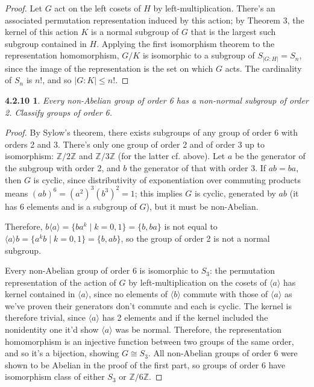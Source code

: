 \documentclass{article}
\newtheorem*{4.2.10}{4.2.10}
\begin{document}
\begin{proof}
  Let $G$ act on the left cosets of $H$ by left-multiplication.
  There's an associated permutation representation induced by this action; by Theorem 3, the kernel of this action $K$ is a normal subgroup of $G$
  that is the largest such subgroup contained in $H$.
  Applying the first isomorphism theorem to the representation homomorphism, $G / K$ is isomorphic to a subgroup of $S_{|G : H|} = S_{n}$,
  since the image of the representation is the set on which $G$ acts.
  The cardinality of $S_{n}$ is $n!$, and so $|G : K| \leq n!$.
\end{proof}

\begin{4.2.10}
  Every non-Abelian group of order 6 has a non-normal subgroup of order 2. Classify groups of order 6.
\end{4.2.10}

\begin{proof}
  By Sylow's theorem, there exists subgroups of any group of order 6 with orders 2 and 3.
  There's only one group of order 2 and of order 3 up to isomorphism: $\mathbb{Z} / 2\mathbb{Z}$ and $\mathbb{Z} / 3\mathbb{Z}$ (for the latter cf. above).
  Let $a$ be the generator of the subgroup with order 2, and $b$ the generator of that with order 3.
  If $ab = ba$, then $G$ is cyclic, since distributivity of exponentiation over commuting products means $(ab)^{6} = (a^{2})^{3}(b^{3})^{2} = 1$;
  this implies $G$ is cyclic, generated by $ab$ (it has 6 elements and is a subgroup of $G$), but it must be non-Abelian.

  Therefore, $b\langle a \rangle = \{ba^{k} \mid k = 0, 1\} = \{b, ba\}$ is not equal to $\langle a \rangle b = \{a^{k}b \mid k = 0, 1\} = \{b, ab\}$,
  so the group of order 2 is not a normal subgroup.

  Every non-Abelian group of order 6 is isomorphic to $S_{3}$: the permutation representation of the action of $G$ by left-multiplication
  on the cosets of $\langle a \rangle$ has kernel contained in $\langle a \rangle$,
  since no elements of $\langle b \rangle$ commute with those of $\langle a \rangle$ as we've proven their generators don't commute and each is cyclic.
  The kernel is therefore trivial, since $\langle a \rangle$ has 2 elements and if the kernel included the nonidentity one it'd show
  $\langle a \rangle$ was be normal.
  Therefore, the representation homomorphism is an injective function between two groups of the same order, and so it's a bijection,
  showing $G \cong S_{3}$.
  All non-Abelian groups of order 6 were shown to be Abelian in the proof of the first part, so groups of order 6 have isomorphism class of either
  $S_{3}$ or $\mathbb{Z} / 6\mathbb{Z}$.
\end{proof}
\end{document}
